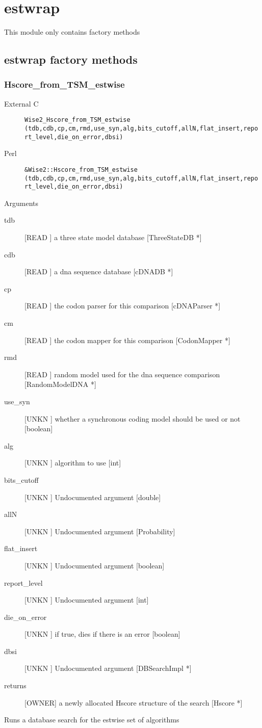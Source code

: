 \section{estwrap}
\label{module_estwrap}
This module only contains factory methods

\subsection{estwrap factory methods}
\subsubsection{Hscore_from_TSM_estwise}
\begin{description}
\item[External C] {\tt Wise2_Hscore_from_TSM_estwise (tdb,cdb,cp,cm,rmd,use_syn,alg,bits_cutoff,allN,flat_insert,report_level,die_on_error,dbsi)}
\item[Perl] {\tt &Wise2::Hscore_from_TSM_estwise (tdb,cdb,cp,cm,rmd,use_syn,alg,bits_cutoff,allN,flat_insert,report_level,die_on_error,dbsi)}

\end{description}
Arguments
\begin{description}
\item[tdb] [READ ] a three state model database [ThreeStateDB *]
\item[cdb] [READ ] a dna sequence database [cDNADB *]
\item[cp] [READ ] the codon parser for this comparison [cDNAParser *]
\item[cm] [READ ] the codon mapper for this comparison [CodonMapper *]
\item[rmd] [READ ] random model used for the dna sequence comparison [RandomModelDNA *]
\item[use_syn] [UNKN ] whether a synchronous coding model should be used or not [boolean]
\item[alg] [UNKN ] algorithm to use [int]
\item[bits_cutoff] [UNKN ] Undocumented argument [double]
\item[allN] [UNKN ] Undocumented argument [Probability]
\item[flat_insert] [UNKN ] Undocumented argument [boolean]
\item[report_level] [UNKN ] Undocumented argument [int]
\item[die_on_error] [UNKN ] if true, dies if there is an error [boolean]
\item[dbsi] [UNKN ] Undocumented argument [DBSearchImpl *]
\item[returns] [OWNER] a newly allocated Hscore structure of the search [Hscore *]
\end{description}
Runs a database search for the estwise set
of algorithms



